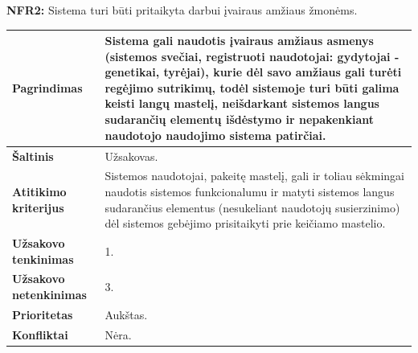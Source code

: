 \documentclass[12pt]{article}
\begin{document}
\noindent \textbf{NFR2:} Sistema turi būti pritaikyta darbui įvairaus amžiaus
žmonėms.
\label{sec:NFR2}
\begin{table}[htb!]
    \captionsetup{justification=centering}
    \begin{tabular}{|m{4.9cm}|m{11cm}|}
        \hline
        \raggedleft \textbf{\cellcolor{deepchampagne}Pagrindimas} &
        Sistema gali naudotis įvairaus amžiaus asmenys (sistemos svečiai,
        registruoti naudotojai: gydytojai - genetikai, tyrėjai), kurie dėl savo
        amžiaus gali turėti regėjimo sutrikimų, todėl sistemoje turi būti galima
        keisti langų mastelį, neišdarkant sistemos langus sudarančių elementų
        išdėstymo ir nepakenkiant naudotojo naudojimo sistema patirčiai. \\
        \hline
        \raggedleft \textbf{\cellcolor{deepchampagne}Šaltinis} & Užsakovas. \\
        \hline
        \raggedleft \textbf{\cellcolor{deepchampagne}Atitikimo kriterijus} & 
        Sistemos naudotojai, pakeitę mastelį, gali ir toliau sėkmingai naudotis
        sistemos funkcionalumu ir matyti sistemos langus sudarančius elementus
        (nesukeliant naudotojų susierzinimo) dėl sistemos gebėjimo prisitaikyti
        prie keičiamo mastelio. \\
        \hline
        \raggedleft \textbf{\cellcolor{deepchampagne}Užsakovo tenkinimas} & 1. \\
        \hline
        \raggedleft \textbf{\cellcolor{deepchampagne}Užsakovo netenkinimas} & 3. \\
        \hline
        \raggedleft \textbf{\cellcolor{deepchampagne}Prioritetas} & Aukštas. \\
        \hline
        \raggedleft \textbf{\cellcolor{deepchampagne}Konfliktai} & Nėra. \\
        \hline
    \end{tabular}
\end{table}

\newpage
\end{document}
